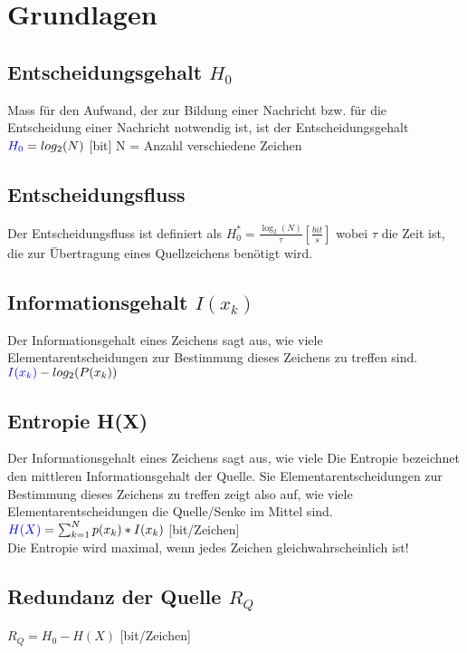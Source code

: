 
\section{Grundlagen}


\subsection{Entscheidungsgehalt $H_0$}
Mass für den Aufwand, der zur Bildung einer Nachricht bzw. für die Entscheidung einer Nachricht notwendig ist, ist der Entscheidungsgehalt\\
\colorbox{lightlightgrey}{$\textcolor{blue}{H_0} = log_2(N)$} [bit]
N = Anzahl verschiedene Zeichen\\

\subsection{Entscheidungsfluss}
Der Entscheidungsfluss ist definiert als
\colorbox{lightlightgrey}{$H_{0}^{*}=\frac{\log _{2}(N)}{\tau}\left[\frac{b i t}{s}\right]$}
wobei $\tau$ die Zeit ist, die zur Übertragung eines Quellzeichens benötigt wird.


\subsection{Informationsgehalt $I(x_k)$}
Der Informationsgehalt eines Zeichens sagt aus, wie viele Elementarentscheidungen zur Bestimmung dieses Zeichens zu treffen sind.
\colorbox{lightlightgrey}{$\textcolor{blue}{I(x_k)} -log_2(P(x_k))$}


\subsection{Entropie H(X)}
Der Informationsgehalt eines Zeichens sagt aus, wie viele Die Entropie bezeichnet den mittleren Informationsgehalt der Quelle. Sie Elementarentscheidungen zur Bestimmung dieses Zeichens zu treffen zeigt also auf, wie viele Elementarentscheidungen die Quelle/Senke im Mittel sind.
\colorbox{lightlightgrey}{$\textcolor{blue}{H(X)} = \sum_{k = 1}^{N}p(x_k) * I(x_k)$} [bit/Zeichen]\\
Die Entropie wird maximal, wenn jedes Zeichen gleichwahrscheinlich ist!


\subsection{Redundanz der Quelle $R_Q$}
\colorbox{lightlightgrey}{$R_Q = H_0 - H(X)$} [bit/Zeichen]


